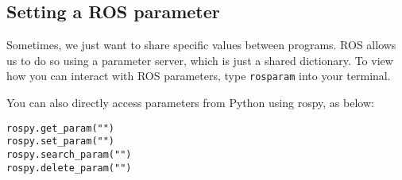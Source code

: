 










\subsection{Setting a ROS parameter}
Sometimes, we just want to share specific values between programs. ROS allows us to do so using a parameter server, which is just a shared dictionary. To view how you can interact with ROS parameters, type \texttt{rosparam} into your terminal.

You can also directly access parameters from Python using rospy, as below:

\begin{lstlisting}
rospy.get_param("")
rospy.set_param("")
rospy.search_param("")
rospy.delete_param("")
\end{lstlisting}

